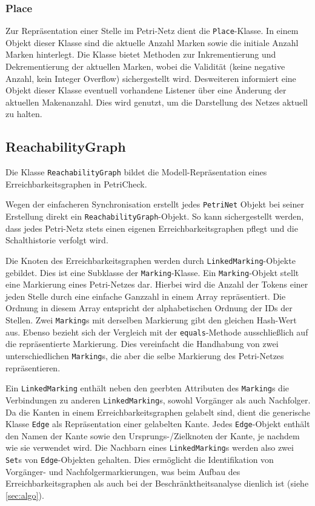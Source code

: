 \subsubsection{Place}
Zur Repräsentation einer Stelle im Petri-Netz dient die \texttt{Place}-Klasse.
In einem Objekt dieser Klasse sind die aktuelle Anzahl Marken sowie die initiale
Anzahl Marken hinterlegt. Die Klasse bietet Methoden zur Inkrementierung und
Dekrementierung der aktuellen Marken, wobei die Validität (keine negative
Anzahl, kein Integer Overflow) sichergestellt wird. Desweiteren informiert eine
Objekt dieser Klasse eventuell vorhandene Listener über eine Änderung der
aktuellen Makenanzahl. Dies wird genutzt, um die Darstellung des Netzes aktuell
zu halten.

\subsection{ReachabilityGraph}
Die Klasse \texttt{ReachabilityGraph} bildet die Modell-Repräsentation eines
Erreichbarkeitsgraphen in PetriCheck.

Wegen der einfacheren Synchronisation erstellt jedes \texttt{PetriNet} Objekt
bei seiner Erstellung direkt ein \texttt{ReachabilityGraph}-Objekt. So kann
sichergestellt werden, dass jedes Petri-Netz stets einen eigenen
Erreichbarkeitsgraphen pflegt und die Schalthistorie verfolgt wird.

Die Knoten des Erreichbarkeitsgraphen werden durch
\texttt{LinkedMarking}-Objekte gebildet. Dies ist eine Subklasse der
\texttt{Marking}-Klasse. Ein \texttt{Marking}-Objekt stellt eine Markierung
eines Petri-Netzes dar. Hierbei wird die Anzahl der Tokens einer jeden Stelle
durch eine einfache Ganzzahl in einem Array repräsentiert. Die Ordnung in diesem
Array entspricht der alphabetischen Ordnung der IDs der Stellen. Zwei
\texttt{Marking}s mit derselben Markierung gibt den gleichen Hash-Wert aus.
Ebenso bezieht sich der Vergleich mit der \texttt{equals}-Methode ausschließlich
auf die repräsentierte Markierung. Dies vereinfacht die Handhabung von zwei
unterschiedlichen \texttt{Marking}s, die aber die selbe Markierung des
Petri-Netzes repräsentieren.

Ein \texttt{LinkedMarking} enthält neben den geerbten Attributen des
\texttt{Marking}s die Verbindungen zu anderen \texttt{LinkedMarking}s, sowohl
Vorgänger als auch Nachfolger. Da die Kanten in einem Erreichbarkeitsgraphen
gelabelt sind, dient die generische Klasse \texttt{Edge} als Repräsentation
einer gelabelten Kante. Jedes \texttt{Edge}-Objekt enthält den Namen der Kante
sowie den Ursprungs-/Zielknoten der Kante, je nachdem wie sie verwendet wird.
Die Nachbarn eines \texttt{LinkedMarking}s werden also zwei \texttt{Set}s von
\texttt{Edge}-Objekten gehalten. Dies ermöglicht die Identifikation von
Vorgänger- und Nachfolgermarkierungen, was beim Aufbau des
Erreichbarkeitsgraphen als auch bei der Beschränktheitsanalyse dienlich ist
(siehe \cref{sec:algo}).

